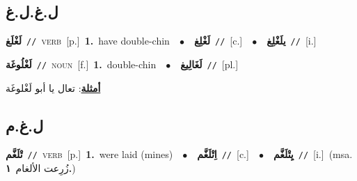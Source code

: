 \documentclass[10pt,a4paper,twoside]{article} %
\begin{document}
\begin{multicols}{2}
\vspace{-3mm}
\subsection*{\color{blue}\foreignlanguage{arabic}{ل.غ.ل.غ}\color{blue}{}} 

{\setlength\topsep{0pt}\textbf{\foreignlanguage{arabic}{لَغْلَغ}}\ {\color{gray}\texttt{//}\color{black}}\ \textsc{verb}\ [p.]\ \textbf{1.}~have double-chin\ \ $\bullet$\ \ \setlength\topsep{0pt}\textbf{\foreignlanguage{arabic}{لَغْلِغ}}\ {\color{gray}\texttt{//}\color{black}}\ [c.]\ \ $\bullet$\ \ \setlength\topsep{0pt}\textbf{\foreignlanguage{arabic}{يلَغْلِغ}}\ {\color{gray}\texttt{//}\color{black}}\ [i.]\ } \vspace{2mm}

{\setlength\topsep{0pt}\textbf{\foreignlanguage{arabic}{لَغْلُوغَة}}\ {\color{gray}\texttt{//}\color{black}}\ \textsc{noun}\ [f.]\ \textbf{1.}~double-chin\ \ $\bullet$\ \ \setlength\topsep{0pt}\textbf{\foreignlanguage{arabic}{لَغَالِيغ}}\ {\color{gray}\texttt{//}\color{black}}\ [pl.]\  \begin{flushright}\color{gray}\foreignlanguage{arabic}{\textbf{\underline{\foreignlanguage{arabic}{أمثلة}}}: تعال يا أبو لَغْلوغَة}\end{flushright}\color{black}} \vspace{2mm}

\vspace{-3mm}
\subsection*{\color{blue}\foreignlanguage{arabic}{ل.غ.م}\color{blue}{}} 

{\setlength\topsep{0pt}\textbf{\foreignlanguage{arabic}{تْلَغَّم}}\ {\color{gray}\texttt{//}\color{black}}\ \textsc{verb}\ [p.]\ \textbf{1.}~were laid (mines)\ \ $\bullet$\ \ \setlength\topsep{0pt}\textbf{\foreignlanguage{arabic}{اِتْلَغَّم}}\ {\color{gray}\texttt{//}\color{black}}\ [c.]\ \ $\bullet$\ \ \setlength\topsep{0pt}\textbf{\foreignlanguage{arabic}{يِتْلَغَّم}}\ {\color{gray}\texttt{//}\color{black}}\ [i.]\ \color{gray}(msa. \foreignlanguage{arabic}{زُرِعت الألغام}~\foreignlanguage{arabic}{\textbf{١.}})\color{black}\ } \vspace{2mm}


\end{multicols}
\end{document}
